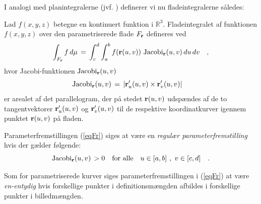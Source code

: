 I analogi med planintegralerne (jvf. ) definerer vi nu fladeintegralerne således:

\begin{definition}[Fladeintegralet] \label{defFladeInt}
Lad $f(x,y,z)$ betegne en kontinuert funktion i $\mathbb{R}^{3}$.
Fladeintegralet af funktionen $f(x,y,z)$ over den parametriserede flade
$F_{\bf r}$ defineres ved
\begin{equation} \label{eqFladeintegral}
\int_{F_{\bf r}} f \, d\mu \, = \, \int_{c}^{d} \int_{a}^{b}
f({\bf r}(u,v))\, \operatorname{Jacobi}_{\bf r}(u,v)\,du \, dv \quad,
\end{equation}
hvor {Jacobi-funktionen  $\operatorname{Jacobi}_{\bf r}(u,v)$}
\begin{equation}
 \operatorname{Jacobi}_{\bf r}(u,v)\, = \,  | {\bf r}'_{u}(u,v) \times {\bf
 r}'_{v}(u,v) |  \quad
\end{equation}
er arealet af det parallelogram, der på stedet
${\bf r}(u,v)$ udspændes af de to tangentvektorer
${\bf r}'_{u}(u,v)$ og ${\bf
 r}'_{v}(u,v)$ til de respektive koordinatkurver igennem punktet
${\bf r}(u,v)$ på fladen.
\end{definition}


\begin{definition} \label{defRegFladeParam}
Parameterfremstillingen (\ref{eqFr}) siges at være en {\em{{regulær parameterfremstilling}}}
hvis der gælder følgende:
\begin{equation}
\operatorname{Jacobi}_{\bf r}(u,v)\, > 0 \quad \text{for alle} \quad  u \in [a,b] \, \,
, \, \,  v \in [c,d] \quad.
\end{equation}
\end{definition}


\begin{definition}\label{defEnEntydFladeparam}
Som for parametriserede kurver siges parameterfremstillingen i
(\ref{eqFr}) at være \emph{en-entydig} hvis forskellige punkter i
definitionsmængden afbildes i forskellige punkter i billedmængden.
\end{definition}


